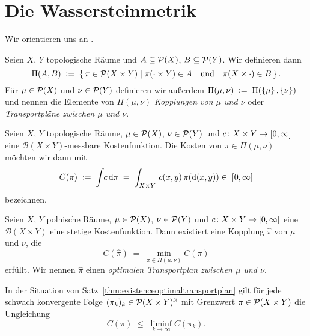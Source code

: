 \documentclass[../main/main.tex]{subfiles}
\begin{document}
	
	\section{Die Wassersteinmetrik}
	
	Wir orientieren uns an \cite{Villani.2009}.
	
	\begin{Definition}[Kopplung]
		Seien $X$, $Y$ topologische Räume und $A \subseteq \mathcal{P}(X)$, $B \subseteq \mathcal{P}(Y)$. Wir definieren dann
		\[ \Pi(A, B) \; \vcentcolon = \; \left\{\, \pi \in \mathcal{P}(X \times Y) \; \middle| \; \pi(\cdot \times Y) \in A \quad \text{und} \quad \pi(X \times \cdot) \in B \,\right\} \text{.}\]
		Für $\mu \in \mathcal{P}(X)$ und $\nu \in \mathcal{P}(Y)$ definieren wir außerdem $\Pi(\mu, \nu) \; \vcentcolon = \; \Pi(\left\{\mu\right\}, \left\{\nu\right\})$ und nennen die
		Elemente von $\Pi(\mu, \nu)$ \emph{Kopplungen von $\mu$ und $\nu$} oder \emph{Transportpläne zwischen $\mu$ und $\nu$}.
	\end{Definition}

	\begin{Definition}
		Seien $X$, $Y$ topologische Räume, $\mu \in \mathcal{P}(X)$, $\nu \in \mathcal{P}(Y)$ und $c \colon X \times Y \to [0, \infty]$ eine $\mathcal{B}(X \times Y)$-messbare Kostenfunktion.
		Die Kosten von $\pi \in \Pi(\mu, \nu)$ möchten wir dann mit
		\[ C(\pi) \; \vcentcolon = \; \int_{} \, c \, \mathrm{d}\pi \; = \; \int_{X \times Y} \, c(x, y) \, \pi(\mathrm{d}(x, y)) \in \; [0, \infty] \]
		bezeichnen.
	\end{Definition}

	\begin{Satz}
		\label{thm:existenceoptimaltransportplan}
		Seien $X$, $Y$ polnische Räume, $\mu \in \mathcal{P}(X)$, $\nu \in \mathcal{P}(Y)$ und $c \colon X \times Y \to [0, \infty]$ eine $\mathcal{B}(X \times Y)$ eine stetige 
		Kostenfunktion. Dann existiert eine Kopplung $\hat{\pi}$ von $\mu$ und $\nu$, die 
		\[ C(\hat{\pi}) \; = \; \min_{\pi \in \Pi(\mu, \nu)} C(\pi) \]
		erfüllt. Wir nennen $\hat{\pi}$ einen \emph{optimalen Transportplan zwischen $\mu$ und $\nu$}.
	\end{Satz}

	\begin{Hilfssatz}
		\label{lem:lsccost}
		In der Situation von Satz~\ref{thm:existenceoptimaltransportplan} gilt für jede schwach konvergente Folge $(\pi_k)_k \in \mathcal{P}(X \times Y)^{\mathbb{N}}$ mit Grenzwert $\pi \in \mathcal{P}(X \times Y)$ die Ungleichung
		\[ C(\pi) \; \leq \; \liminf_{k \to \infty} C(\pi_k) \text{.} \]
	\end{Hilfssatz}
\end{document}
